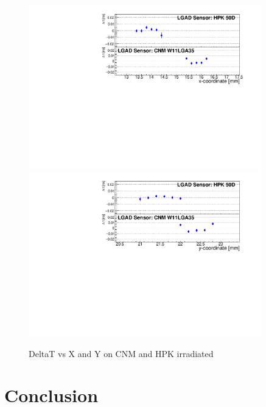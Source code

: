 \documentclass[preprint,1p]{elsarticle}
\begin{document}
\begin{figure}[htbp] 
\centering
\includegraphics[width=0.9\textwidth]{figs/USCSBoard_HPK50DIrradiated-CNMW11LGA35_Run936-961/IrradiatedSensorStudy_MeanTime_vs_X.pdf} 
\includegraphics[width=0.9\textwidth]{figs/USCSBoard_HPK50DIrradiated-CNMW11LGA35_Run936-961/IrradiatedSensorStudy_MeanTime_vs_Y.pdf} 
\caption{DeltaT vs X and Y on CNM and HPK irradiated} 
\label{fig:Sensors} 
\end{figure} 
 

\section{Conclusion}
\label{sec:conclusion} 
\end{document}
